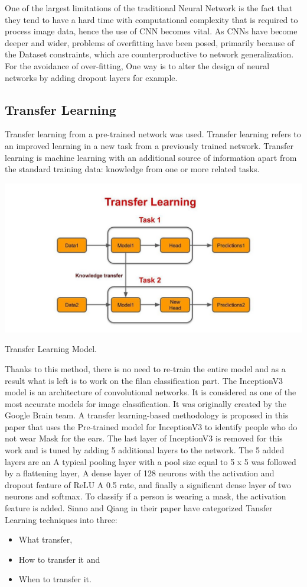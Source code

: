 One of the largest limitations of the traditional Neural Network is the fact that they tend to have a hard time 
with computational complexity that is required to process image data, hence the use of CNN becomes vital. \cite{o2015introduction}
As CNNs have become deeper and wider, problems of overfitting have been posed, primarily because of the
Dataset constraints, which are counterproductive to network generalization. For the avoidance of over-fitting,
One way is to alter the design of neural networks by adding dropout layers for example.


\subsection{Transfer Learning}
Transfer learning from a pre-trained network was used.
Transfer learning refers to an improved learning in a new task from a previously trained network. 
Transfer learning is machine learning with an additional source of information
apart from the standard training data: knowledge from one or more related tasks.\cite{torrey2010transfer}

\includegraphics[width=.6\textwidth,height=.7\textheight,keepaspectratio]{tex/images/Transfer.jpeg}
\caption{Transfer Learning Model.}

Thanks to this method, there is no need to re-train the entire model and as a result what is left is to work on the filan classification part.
The InceptionV3 model is an architecture of convolutional networks. It is considered as one of the most accurate models for image classification. It was originally created by the Google Brain team.\cite{hussain2018study}
A transfer learning-based methodology is proposed in this paper that uses the
Pre-trained model for InceptionV3 to identify people who do not wear
Mask for the ears. The last layer of InceptionV3 is removed for this work and is tuned by adding 5 additional layers to the network. 
The 5 added layers are an
A typical pooling layer with a pool size equal to 5 x 5 was followed by a flattening layer,
A dense layer of 128 neurons with the activation and dropout feature of ReLU
A 0.5 rate, and finally a significant dense layer of two neurons and softmax. To classify if a person is wearing a mask, the activation feature is added. Sinno and Qiang \cite{pan2009survey}
in their paper have categorized Tansfer Learning techniques into three:
\begin{itemize}
    \item What transfer,
    \item How to transfer it and
    \item When to transfer it.
\end{itemize}


